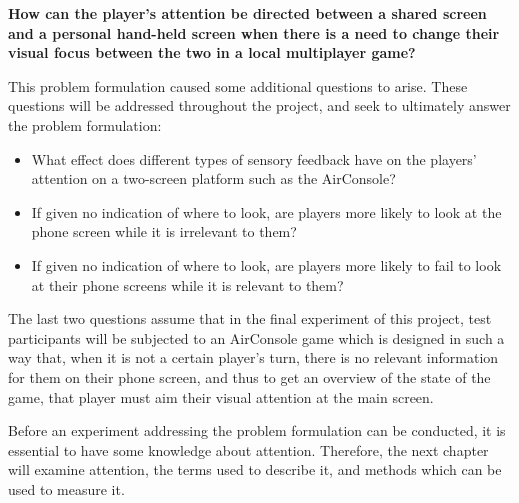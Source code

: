 \begin{changemargin}{1cm}{1cm}
\textbf{How can the player’s attention be directed between a shared screen and a personal hand-held screen when there is a need to change their visual focus between the two in a local multiplayer game?}
\end{changemargin}

This problem formulation caused some additional questions to arise. These questions will be addressed throughout the project, and seek to ultimately answer the problem formulation:
\begin{itemize}
\item What effect does different types of sensory feedback have on the players' attention on a two-screen platform such as the AirConsole?
\item If given no indication of where to look, are players more likely to look at the phone screen while it is irrelevant to them?
\item If given no indication of where to look, are players more likely to fail to look at their phone screens while it is relevant to them?
\end{itemize}

The last two questions assume that in the final experiment of this project, test participants will be subjected to an AirConsole game which is designed in such a way that, when it is not a certain player’s turn, there is no relevant information for them on their phone screen, and thus to get an overview of the state of the game, that player must aim their visual attention at the main screen.

Before an experiment addressing the problem formulation can be conducted, it is essential to have some knowledge about attention. Therefore, the next chapter will examine attention, the terms used to describe it, and methods which can be used to measure it.